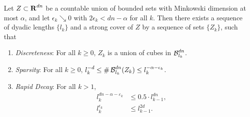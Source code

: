 \begin{lemma}\label{coveringLemma}
	Let $Z \subset \operatorname{\mathbf{R}}^{dn}$ be a countable union of bounded sets with Minkowski dimension at most $\alpha$, and let $\epsilon_k \searrow 0$ with $2\epsilon_k < dn - \alpha$ for all $k$. Then there exists a sequence of dyadic lengths $\{ l_k \}$ and a strong cover of $Z$ by a sequence of sets $\{ Z_k \}$, such that
	\begin{enumerate}
		\item\label{DiscretenessProperty} \emph{Discreteness}: For all $k \geq 0$, $Z_k$ is a union of cubes in $\operatorname{\mathcal{B}}^{dn}_{l_k}$.

		\item\label{SparsityProperty} \emph{Sparsity}: For all $k \geq 0$, $l_k^{-d} \leq \#\operatorname{\mathcal{B}}^{dn}_{l_k}(Z_k) \leq l_k^{-\alpha-\epsilon_k}$.

		\item\label{RapidDecayProperty} \emph{Rapid Decay}: For all $k > 1$,
			\begin{align}
				l_k^{dn-\alpha-\varepsilon_k} & \leq 0.5 \cdot l_{k-1}^{dn} \label{coverBoundRequirement}, \\
				l_k^{\epsilon_k} & \leq l_{k-1}^{2d}\label{quadDecayRequirement}.
			\end{align}
	\end{enumerate}
\end{lemma}
